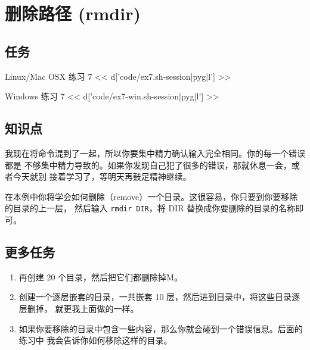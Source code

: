 \chapter{删除路径 (rmdir)}

\section{任务}

\begin{code}{Linux/Mac OSX 练习 7}
<< d['code/ex7.sh-session|pyg|l'] >>
\end{code}

\begin{code}{Windows 练习 7}
<< d['code/ex7-win.sh-session|pyg|l'] >>
\end{code}


\section{知识点}

我现在将命令混到了一起，所以你要集中精力确认输入完全相同。你的每一个错误都是
不够集中精力导致的。如果你发现自己犯了很多的错误，那就休息一会，或者今天就别
接着学习了，等明天再鼓足精神继续。

在本例中你将学会如何删除（remove）一个目录。这很容易，你只要到你要移除的目录的上一层，
然后输入 \verb|rmdir DIR|，将 DIR 替换成你要删除的目录的名称即可。

\section{更多任务}

\begin{enumerate}
\item 再创建 20 个目录，然后把它们都删除掉M。
\item 创建一个逐层嵌套的目录，一共嵌套 10 层，然后进到目录中，将这些目录逐层删掉，
    就更我上面做的一样。
\item 如果你要移除的目录中包含一些内容，那么你就会碰到一个错误信息。后面的练习中
    我会告诉你如何移除这样的目录。
\end{enumerate}

